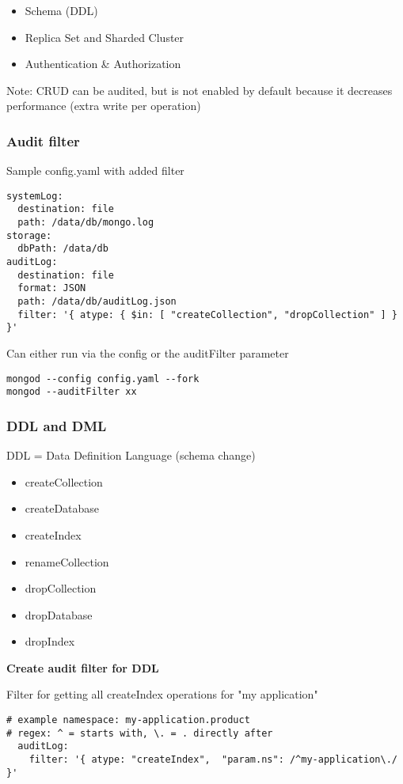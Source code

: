 \documentclass[11pt]{article}
\begin{document}
\begin{itemize}
\item Schema (DDL)
\item Replica Set and Sharded Cluster
\item Authentication \& Authorization
\end{itemize}

Note: CRUD can be audited, but is not enabled by default because it decreases performance (extra write per operation)

\subsubsection{Audit filter}
\label{sec:orgc102ecc}
Sample config.yaml with added filter
\begin{verbatim}
systemLog:
  destination: file
  path: /data/db/mongo.log
storage:
  dbPath: /data/db
auditLog:
  destination: file
  format: JSON
  path: /data/db/auditLog.json
  filter: '{ atype: { $in: [ "createCollection", "dropCollection" ] } }'
\end{verbatim}

Can either run via the config or the auditFilter parameter
\begin{verbatim}
mongod --config config.yaml --fork
mongod --auditFilter xx
\end{verbatim}

\subsubsection{DDL and DML}
\label{sec:orgbc7f593}
DDL = Data Definition Language (schema change)
\begin{itemize}
\item createCollection
\item createDatabase
\item createIndex
\item renameCollection
\item dropCollection
\item dropDatabase
\item dropIndex
\end{itemize}

\textbf{Create audit filter for DDL}

Filter for getting all createIndex operations for "my application"
\begin{verbatim}
# example namespace: my-application.product
# regex: ^ = starts with, \. = . directly after
  auditLog:
    filter: '{ atype: "createIndex",  "param.ns": /^my-application\./ }'   
\end{verbatim}
\end{document}
